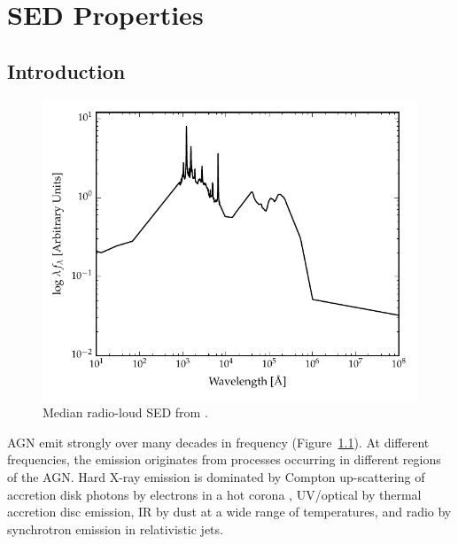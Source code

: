 
\chapter{SED Properties}
\label{ch:sed} 



\section{Introduction}

\begin{figure}
  \centering
  \includegraphics[width=\textwidth]{figures/chapter05/shangsed.pdf}
  \caption{Median radio-loud \ac{SED} from \citet{shang11}.}
  \label{fig:seyfert_sed}
\end{figure}

\ac{AGN} emit strongly over many decades in frequency (Figure~\ref{fig:seyfert_sed}). 
At different frequencies, the emission originates from processes occurring in different regions of the \ac{AGN}. 
Hard X-ray emission is dominated by Compton up-scattering of accretion disk photons by electrons in a hot corona \citep[e.g.][]{sunyaev80}, \ac{UV}/optical by thermal accretion disc emission, \ac{IR} by dust at a wide range of temperatures, and radio by synchrotron emission in relativistic jets.   


